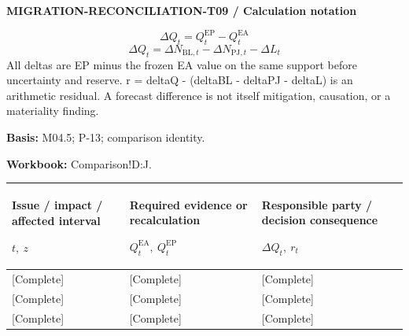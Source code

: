 \par\begingroup\sffamily\fontsize{8}{10}\selectfont\color{NEBGreen}\setlength{\parskip}{2pt}\setlength{\abovedisplayskip}{4pt}\setlength{\belowdisplayskip}{4pt}\setlength{\abovedisplayshortskip}{2pt}\setlength{\belowdisplayshortskip}{3pt}
\textbf{MIGRATION-RECONCILIATION-T09 / Calculation notation}\par
{\fontsize{9}{11}\selectfont\[ \Delta Q_t=Q_t^{\mathrm{EP}}-Q_t^{\mathrm{EA}} \]}
{\fontsize{9}{11}\selectfont\[ \Delta Q_t=\Delta N_{\mathrm{BL},t}-\Delta N_{\mathrm{PJ},t}-\Delta L_t \]}
All deltas are EP minus the frozen EA value on the same support before uncertainty and reserve. r = deltaQ - (deltaBL - deltaPJ - deltaL) is an arithmetic residual. A forecast difference is not itself mitigation, causation, or a materiality finding.\par
\textbf{Basis:} M04.5; P-13; comparison identity.\par
\textbf{Workbook:} Comparison!D:J.\par\endgroup
{\sffamily\fontsize{8.3}{10.3}\selectfont\begin{longtable}{@{}P{54.83mm} P{54.83mm} P{54.83mm}@{}}
\toprule
\textbf{Issue / impact / affected interval}\par {\normalfont\fontsize{8.2}{10}\selectfont $t,\ z$} & \textbf{Required evidence or recalculation}\par {\normalfont\fontsize{8.2}{10}\selectfont $Q_t^{\mathrm{EA}},\ Q_t^{\mathrm{EP}}$} & \textbf{Responsible party / decision consequence}\par {\normalfont\fontsize{8.2}{10}\selectfont $\Delta Q_t,\ r_t$}\\\midrule\endhead
\rule{0pt}{8mm}[Complete] & [Complete] & [Complete]\\\hline
\rule{0pt}{8mm}[Complete] & [Complete] & [Complete]\\\hline
\rule{0pt}{8mm}[Complete] & [Complete] & [Complete]\\\hline
\end{longtable}}
